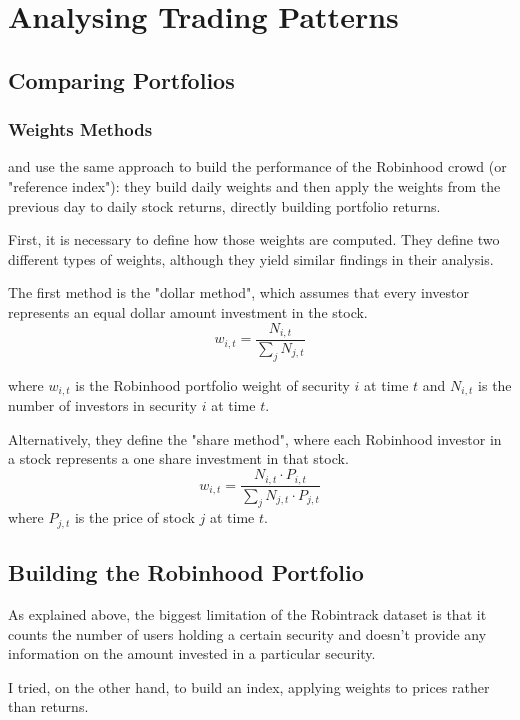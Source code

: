 \section{Analysing Trading Patterns}


\subsection{Comparing Portfolios}
\subsubsection{Weights Methods} 
\cite{Fedyk2024} and \cite{Welch2022} use the same approach to build the performance of the Robinhood crowd (or "reference index"): 
they build daily weights and then apply the weights from the previous day to daily stock returns, directly building portfolio returns. 

First, it is necessary to define how those weights are computed. They define two different types of weights, although they yield similar findings in their analysis.

The first method is the "dollar method", which assumes that every investor represents an equal dollar amount investment in the stock. 
\begin{equation}
    w_{i,t} = \frac{N_{i,t}}{\sum_j N_{j,t}}
\end{equation}

where $w_{i,t}$ is the Robinhood portfolio weight of security $i$ at time $t$ and $N_{i,t}$ is the number of investors in security $i$ at time $t$.

Alternatively, they define the "share method", where each Robinhood investor in a stock represents a one share investment in that stock.
\begin{equation}
    w_{i,t} = \frac{N_{i,t}\cdot P_{i,t}}{\sum_j N_{j,t}\cdot P_{j,t}}
\end{equation}
where $P_{j,t}$ is the price of stock $j$ at time $t$.

\subsection{Building the Robinhood Portfolio}
As explained above, the biggest limitation of the Robintrack dataset is that it counts the number of users holding a certain security and doesn't provide any information on the amount invested in a particular security. 

I tried, on the other hand, to build an index, applying weights to prices rather than returns.  

